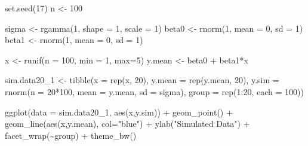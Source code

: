 \documentclass[
]{article}
\newenvironment{Shaded}{\begin{snugshade}}{\end{snugshade}}
\newcommand{\AttributeTok}[1]{\textcolor[rgb]{0.77,0.63,0.00}{#1}}
\newcommand{\DecValTok}[1]{\textcolor[rgb]{0.00,0.00,0.81}{#1}}
\newcommand{\FunctionTok}[1]{\textcolor[rgb]{0.00,0.00,0.00}{#1}}
\newcommand{\NormalTok}[1]{#1}
\newcommand{\OtherTok}[1]{\textcolor[rgb]{0.56,0.35,0.01}{#1}}
\newcommand{\SpecialCharTok}[1]{\textcolor[rgb]{0.00,0.00,0.00}{#1}}
\newcommand{\StringTok}[1]{\textcolor[rgb]{0.31,0.60,0.02}{#1}}
\begin{document}
\begin{Shaded}
\begin{Highlighting}[]
\FunctionTok{set.seed}\NormalTok{(}\DecValTok{17}\NormalTok{)}
\NormalTok{n }\OtherTok{\textless{}{-}} \DecValTok{100}

\NormalTok{sigma }\OtherTok{\textless{}{-}} \FunctionTok{rgamma}\NormalTok{(}\DecValTok{1}\NormalTok{, }\AttributeTok{shape =} \DecValTok{1}\NormalTok{, }\AttributeTok{scale =} \DecValTok{1}\NormalTok{)}
\NormalTok{beta0 }\OtherTok{\textless{}{-}} \FunctionTok{rnorm}\NormalTok{(}\DecValTok{1}\NormalTok{, }\AttributeTok{mean =} \DecValTok{0}\NormalTok{, }\AttributeTok{sd =} \DecValTok{1}\NormalTok{)}
\NormalTok{beta1 }\OtherTok{\textless{}{-}} \FunctionTok{rnorm}\NormalTok{(}\DecValTok{1}\NormalTok{, }\AttributeTok{mean =} \DecValTok{0}\NormalTok{, }\AttributeTok{sd =} \DecValTok{1}\NormalTok{)}

\NormalTok{x }\OtherTok{\textless{}{-}} \FunctionTok{runif}\NormalTok{(}\AttributeTok{n =} \DecValTok{100}\NormalTok{, }\AttributeTok{min =} \DecValTok{1}\NormalTok{, }\AttributeTok{max=}\DecValTok{5}\NormalTok{)}
\NormalTok{y.mean }\OtherTok{\textless{}{-}}\NormalTok{ beta0 }\SpecialCharTok{+}\NormalTok{ beta1}\SpecialCharTok{*}\NormalTok{x}

\NormalTok{sim.data20\_1 }\OtherTok{\textless{}{-}} \FunctionTok{tibble}\NormalTok{(}\AttributeTok{x =} \FunctionTok{rep}\NormalTok{(x, }\DecValTok{20}\NormalTok{), }
              \AttributeTok{y.mean =} \FunctionTok{rep}\NormalTok{(y.mean, }\DecValTok{20}\NormalTok{), }
              \AttributeTok{y.sim =} \FunctionTok{rnorm}\NormalTok{(}\AttributeTok{n =} \DecValTok{20}\SpecialCharTok{*}\DecValTok{100}\NormalTok{, }
                            \AttributeTok{mean =}\NormalTok{ y.mean, }
                            \AttributeTok{sd =}\NormalTok{ sigma), }
              \AttributeTok{group =} \FunctionTok{rep}\NormalTok{(}\DecValTok{1}\SpecialCharTok{:}\DecValTok{20}\NormalTok{, }\AttributeTok{each =} \DecValTok{100}\NormalTok{))}

\FunctionTok{ggplot}\NormalTok{(}\AttributeTok{data =}\NormalTok{ sim.data20\_1, }\FunctionTok{aes}\NormalTok{(x,y.sim)) }\SpecialCharTok{+} 
  \FunctionTok{geom\_point}\NormalTok{() }\SpecialCharTok{+} 
  \FunctionTok{geom\_line}\NormalTok{(}\FunctionTok{aes}\NormalTok{(x,y.mean), }\AttributeTok{col=}\StringTok{"blue"}\NormalTok{) }\SpecialCharTok{+} 
  \FunctionTok{ylab}\NormalTok{(}\StringTok{"Simulated Data"}\NormalTok{) }\SpecialCharTok{+} 
  \FunctionTok{facet\_wrap}\NormalTok{(}\SpecialCharTok{\textasciitilde{}}\NormalTok{group) }\SpecialCharTok{+}
  \FunctionTok{theme\_bw}\NormalTok{()}
\end{Highlighting}
\end{Shaded}
\end{document}
